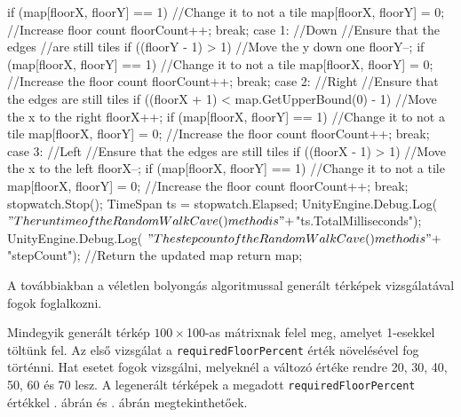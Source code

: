 \begin{java}
{{{{                    if (map[floorX, floorY] == 1)
                    {
                        //Change it to not a tile
                        map[floorX, floorY] = 0;
                        //Increase floor count
                        floorCount++;
                    }
                }
                break;
            case 1: //Down
                //Ensure that the edges
                //are still tiles
                if ((floorY - 1) > 1)
                {
                    //Move the y down one
                    floorY--;
                    if (map[floorX, floorY] == 1)
                    {
                        //Change it to not a tile
                        map[floorX, floorY] = 0;
                        //Increase the floor count
                        floorCount++;
                    }
                }
                break;
            case 2: //Right
                //Ensure that the edges are still tiles
                if ((floorX + 1) < 
                    map.GetUpperBound(0) - 1)
                {
                    //Move the x to the right
                    floorX++;
                    if (map[floorX, floorY] == 1)
                    {
                        //Change it to not a tile
                        map[floorX, floorY] = 0;
                        //Increase the floor count
                        floorCount++;
                    }
                }
                break;
            case 3: //Left
                //Ensure that the edges are still tiles
                if ((floorX - 1) > 1)
                {
                    //Move the x to the left
                    floorX--;
                    if (map[floorX, floorY] == 1)
                    {
                        //Change it to not a tile
                        map[floorX, floorY] = 0;
                        //Increase the floor count
                        floorCount++;
                    }
                }
                break;
        }
    }
    stopwatch.Stop();
    TimeSpan ts = stopwatch.Elapsed;
    UnityEngine.Debug.Log(
        $"The runtime of the RandomWalkCave() method is " +
        $"{ts.TotalMilliseconds}");
    UnityEngine.Debug.Log(
        $"The stepcount of the RandomWalkCave() method is " +
        $"{stepCount}");
    //Return the updated map
    return map;
}
\end{java}

A továbbiakban a véletlen bolyongás algoritmussal generált térképek vizsgálatával fogok foglalkozni.

Mindegyik generált térkép $100 \times $100-as mátrixnak felel meg, amelyet 1-esekkel töltünk fel. Az első vizsgálat a \texttt{requiredFloorPercent} érték növelésével fog történni. Hat esetet fogok vizsgálni, melyeknél a változó értéke rendre 20, 30, 40, 50, 60 és 70 lesz. A legenerált térképek a megadott \texttt{requiredFloorPercent} értékkel . ábrán és . ábrán megtekinthetőek.

